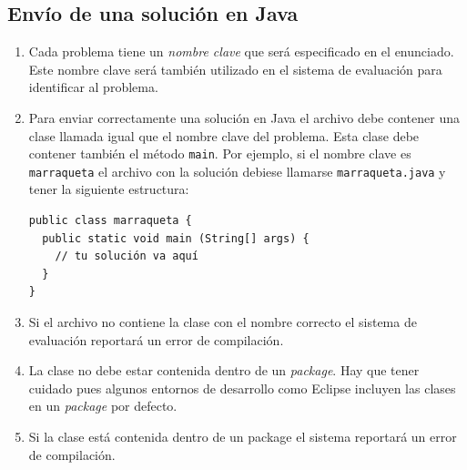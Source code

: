 \documentclass[12pt]{oci}
\begin{document}

\subsection*{Envío de una solución en Java}

\begin{enumerate}
  \item Cada problema tiene un \emph{nombre clave} que será especificado en el
    enunciado.
    Este nombre clave será también utilizado en el sistema de evaluación
    para identificar al problema.
  \item Para enviar correctamente una solución en Java el archivo debe contener
    una clase llamada igual que el nombre clave del problema.
    Esta clase debe contener también el método \verb+main+.
    Por ejemplo, si el nombre clave es \texttt{marraqueta} el archivo con la
    solución debiese llamarse \texttt{marraqueta.java} y tener la siguiente
    estructura:

\begin{verbatim}
public class marraqueta {
  public static void main (String[] args) {
    // tu solución va aquí
  }
}
\end{verbatim}
  \item Si el archivo no contiene la clase con el nombre correcto el sistema de
    evaluación reportará un error de compilación.

  \item La clase no debe estar contenida dentro de un \emph{package}.
      Hay que tener cuidado pues algunos entornos de desarrollo como Eclipse
    incluyen las clases en un \emph{package} por defecto.
  \item Si la clase está contenida dentro de un package el sistema reportará un
    error de compilación.
\end{enumerate}
\end{document}
